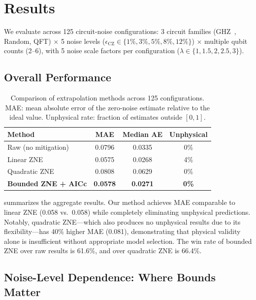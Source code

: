 \section{Results}
\label{sec:results}

We evaluate across 125 circuit-noise configurations: 3 circuit families (GHZ~\cite{Greenberger1989}, Random, QFT) $\times$ 5 noise levels ($\epsilon_\text{CZ} \in \{1\%, 3\%, 5\%, 8\%, 12\%\}$) $\times$ multiple qubit counts (2--6), with 5 noise scale factors per configuration ($\lambda \in \{1, 1.5, 2, 2.5, 3\}$).

\subsection{Overall Performance}

\begin{table}[!htbp]
\caption{Comparison of extrapolation methods across 125 configurations. MAE: mean absolute error of the zero-noise estimate relative to the ideal value. Unphysical rate: fraction of estimates outside $[0, 1]$.}
\label{tab:overall}
\begin{ruledtabular}
\begin{tabular}{lccc}
Method & MAE & Median AE & Unphysical \\
\hline
Raw (no mitigation) & 0.0796 & 0.0335 & 0\% \\
Linear ZNE & 0.0575 & 0.0268 & 4\% \\
Quadratic ZNE & 0.0808 & 0.0629 & 0\% \\
\textbf{Bounded ZNE + AICc} & \textbf{0.0578} & \textbf{0.0271} & \textbf{0\%} \\
\end{tabular}
\end{ruledtabular}
\end{table}

 summarizes the aggregate results. Our method achieves MAE comparable to linear ZNE (0.058 vs.\ 0.058) while completely eliminating unphysical predictions. Notably, quadratic ZNE---which also produces no unphysical results due to its flexibility---has 40\% higher MAE (0.081), demonstrating that physical validity alone is insufficient without appropriate model selection. The win rate of bounded ZNE over raw results is 61.6\%, and over quadratic ZNE is 66.4\%.

\subsection{Noise-Level Dependence: Where Bounds Matter}

